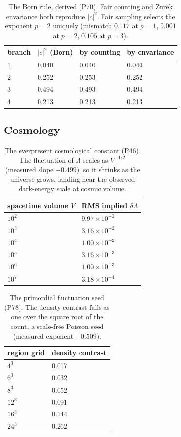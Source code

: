 \begin{table}[H]
\centering
\small
\begin{tabular}{llll}
\toprule
\multicolumn{1}{c}{branch} & \multicolumn{1}{c}{$|c|^2$ (Born)} & \multicolumn{1}{c}{by counting} & \multicolumn{1}{c}{by envariance} \\
\midrule
1 & 0.040 & 0.040 & 0.040 \\
2 & 0.252 & 0.253 & 0.252 \\
3 & 0.494 & 0.493 & 0.494 \\
4 & 0.213 & 0.213 & 0.213 \\
\bottomrule
\end{tabular}
\caption{The Born rule, derived (P70). Fair counting and Zurek envariance both reproduce $|c|^2$. Fair sampling selects the exponent $p=2$ uniquely (mismatch $0.117$ at $p=1$, $0.001$ at $p=2$, $0.105$ at $p=3$).}
\end{table}

\subsection{Cosmology}

\begin{table}[H]
\centering
\small
\begin{tabular}{ll}
\toprule
\multicolumn{1}{c}{spacetime volume $V$} & \multicolumn{1}{c}{RMS implied $\delta\Lambda$} \\
\midrule
$10^2$ & $9.97\times 10^{-2}$ \\
$10^3$ & $3.16\times 10^{-2}$ \\
$10^4$ & $1.00\times 10^{-2}$ \\
$10^5$ & $3.16\times 10^{-3}$ \\
$10^6$ & $1.00\times 10^{-3}$ \\
$10^7$ & $3.18\times 10^{-4}$ \\
\bottomrule
\end{tabular}
\caption{The everpresent cosmological constant (P46). The fluctuation of $\Lambda$ scales as $V^{-1/2}$ (measured slope $-0.499$), so it shrinks as the universe grows, landing near the observed dark-energy scale at cosmic volume.}
\end{table}

\begin{table}[H]
\centering
\small
\begin{tabular}{ll}
\toprule
\multicolumn{1}{c}{region grid} & \multicolumn{1}{c}{density contrast} \\
\midrule
$4^3$ & 0.017 \\
$6^3$ & 0.032 \\
$8^3$ & 0.052 \\
$12^3$ & 0.091 \\
$16^3$ & 0.144 \\
$24^3$ & 0.262 \\
\bottomrule
\end{tabular}
\caption{The primordial fluctuation seed (P78). The density contrast falls as one over the square root of the count, a scale-free Poisson seed (measured exponent $-0.509$).}
\end{table}

